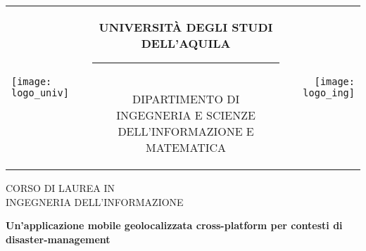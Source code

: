\begin{titlepage}

\begin{center}
\normalsize

\begin{center}
\begin{tabular}[t]{@{} l @{} c @{} r @{}}
\parbox[c]{0.15\textwidth}{\raggedright \texttt{[image: logo\_univ]}}
&
\parbox[c]{0.7\textwidth}
{
\centering \bfseries
UNIVERSITÀ DEGLI STUDI DELL'AQUILA \\[-5pt]
\rule{0.65\textwidth}{1pt} \\
{\scshape DIPARTIMENTO DI \\ INGEGNERIA E SCIENZE DELL'INFORMAZIONE E MATEMATICA }
}
&
\parbox[c]{0.15\textwidth}{\raggedleft \texttt{[image: logo\_ing]}}
\end{tabular}
\end{center}

\bigskip \bigskip



\bigskip \bigskip

{\small CORSO DI LAUREA IN} \\
INGEGNERIA DELL'INFORMAZIONE

\vfil \vfil \vfil

{\bfseries \large
Un'applicazione mobile geolocalizzata cross-platform per contesti di disaster-management\\
}

\vfil \vfil \vfil

\end{center}
\end{titlepage}
